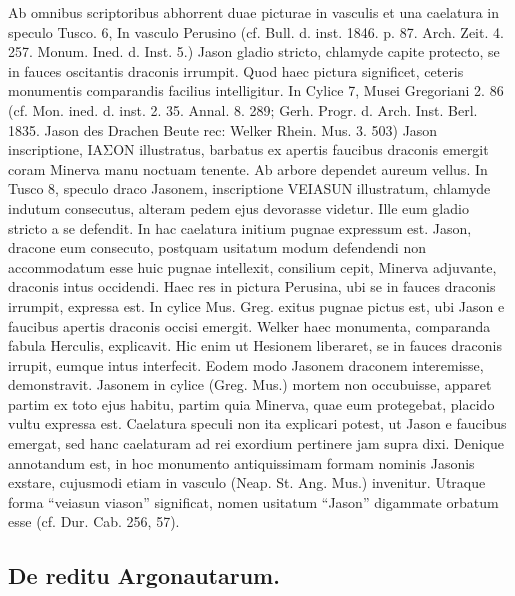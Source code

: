 \documentclass[a4paper, 11pt, oneside, polutonikogreek, german]{article}
\begin{document}
Ab omnibus scriptoribus abhorrent duae picturae in vasculis et una caelatura in speculo Tusco. 6, In vasculo Perusino (cf. Bull. d. inst. 1846. p. 87. Arch. Zeit. 4. 257. Monum. Ined. d. Inst. 5.) Jason gladio stricto, chlamyde capite protecto, se in fauces oscitantis draconis irrumpit. Quod haec pictura significet, ceteris monumentis comparandis facilius intelligitur. In Cylice 7, Musei Gregoriani 2. 86 (cf. Mon. ined. d. inst. 2. 35. Annal. 8. 289; Gerh. Progr. d. Arch. Inst. Berl. 1835. Jason des Drachen Beute rec: Welker Rhein. Mus. 3. 503) Jason inscriptione, ΙΑΣΟΝ illustratus, barbatus ex apertis faucibus draconis emergit coram Minerva manu noctuam tenente. Ab arbore dependet aureum vellus. In Tusco 8, speculo draco Jasonem, inscriptione VEIASUN illustratum, chlamyde indutum consecutus, alteram pedem ejus devorasse videtur. Ille eum gladio stricto a se defendit. In hac caelatura initium pugnae expressum est. Jason, dracone eum consecuto, postquam usitatum modum defendendi non accommodatum esse huic pugnae intellexit, consilium cepit, Minerva adjuvante, draconis intus occidendi. Haec res in pictura Perusina, ubi se in fauces draconis irrumpit, expressa est. In cylice Mus. Greg. exitus pugnae pictus est, ubi Jason e faucibus apertis draconis occisi emergit. Welker haec monumenta, comparanda fabula Herculis, explicavit. Hic enim ut Hesionem liberaret, se in fauces draconis irrupit, eumque intus interfecit. Eodem modo Jasonem draconem interemisse, demonstravit. Jasonem in cylice (Greg. Mus.) mortem non occubuisse, apparet partim ex toto ejus habitu, partim quia Minerva, quae eum protegebat, placido vultu expressa est. Caelatura speculi non ita explicari potest, ut Jason e faucibus emergat, sed hanc caelaturam ad rei exordium pertinere jam supra dixi. Denique annotandum est, in hoc monumento antiquissimam formam nominis Jasonis exstare, cujusmodi etiam in vasculo (Neap. St. Ang. Mus.) invenitur. Utraque forma "`veiasun viason"' significat, nomen usitatum "`Jason"' digammate orbatum esse (cf. Dur. Cab. 256, 57).

\subsection{De reditu Argonautarum.}
\end{document}
